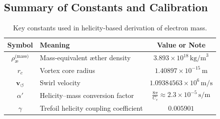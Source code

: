\subsection*{Summary of Constants and Calibration}

\begin{table}[H]
\centering
\footnotesize
\renewcommand{\arraystretch}{1.4}
\begin{tabular}{|c|l|c|}
\hline
\textbf{Symbol} & \textbf{Meaning} & \textbf{Value or Note} \\
\hline
\( \rho_\text{\ae}^{\text{(mass)}} \) & Mass-equivalent æther density & \( 3.893 \times 10^{18} \, \text{kg/m}^3 \) \\
\( r_c \) & Vortex core radius & \( 1.40897 \times 10^{-15} \, \text{m} \) \\
\( \mathbf{v}_{\scriptscriptstyle\boldsymbol{\circlearrowleft}} \) & Swirl velocity & \( 1.09384563 \times 10^6 \, \text{m/s} \) \\
\( \alpha' \) & Helicity–mass conversion factor & \( \frac{8\pi}{C_e} \approx 2.3 \times 10^{-5} \, \text{s/m} \) \\
\( \gamma \) & Trefoil helicity coupling coefficient & \( \boxed{0.005901} \) \\
\hline
\end{tabular}
\caption{Key constants used in helicity-based derivation of electron mass.}
\end{table}